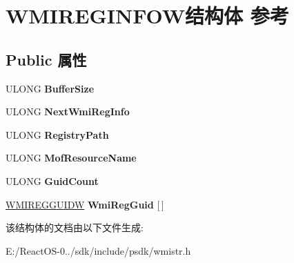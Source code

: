 \hypertarget{struct_w_m_i_r_e_g_i_n_f_o_w}{}\section{W\+M\+I\+R\+E\+G\+I\+N\+F\+O\+W结构体 参考}
\label{struct_w_m_i_r_e_g_i_n_f_o_w}
\subsection*{Public 属性}
\begin{DoxyCompactItemize}
\item 
\mbox{\label{struct_w_m_i_r_e_g_i_n_f_o_w_a1febd9cb60b2e7cc80b473a3f2243b38}} 
U\+L\+O\+NG {\bfseries Buffer\+Size}
\item 
\mbox{\label{struct_w_m_i_r_e_g_i_n_f_o_w_ac8cd9fc3ebb1db34e23adb3775f005fa}} 
U\+L\+O\+NG {\bfseries Next\+Wmi\+Reg\+Info}
\item 
\mbox{\label{struct_w_m_i_r_e_g_i_n_f_o_w_a79ddd50cf60dbb834dcb330caaef6ca3}} 
U\+L\+O\+NG {\bfseries Registry\+Path}
\item 
\mbox{\label{struct_w_m_i_r_e_g_i_n_f_o_w_aa4e0e154ed50c45e4e698ab3206ebb04}} 
U\+L\+O\+NG {\bfseries Mof\+Resource\+Name}
\item 
\mbox{\label{struct_w_m_i_r_e_g_i_n_f_o_w_a27eabab7857edd933a90e08c78782acc}} 
U\+L\+O\+NG {\bfseries Guid\+Count}
\item 
\mbox{\label{struct_w_m_i_r_e_g_i_n_f_o_w_aee8f580f14c8de1bc448d9380f136363}} 
\hyperlink{struct_w_m_i_r_e_g_g_u_i_d_w}{W\+M\+I\+R\+E\+G\+G\+U\+I\+DW} {\bfseries Wmi\+Reg\+Guid} \mbox{[}$\,$\mbox{]}
\end{DoxyCompactItemize}


该结构体的文档由以下文件生成\+:\begin{DoxyCompactItemize}
\item 
E\+:/\+React\+O\+S-\/0../sdk/include/psdk/wmistr.\+h\end{DoxyCompactItemize}
